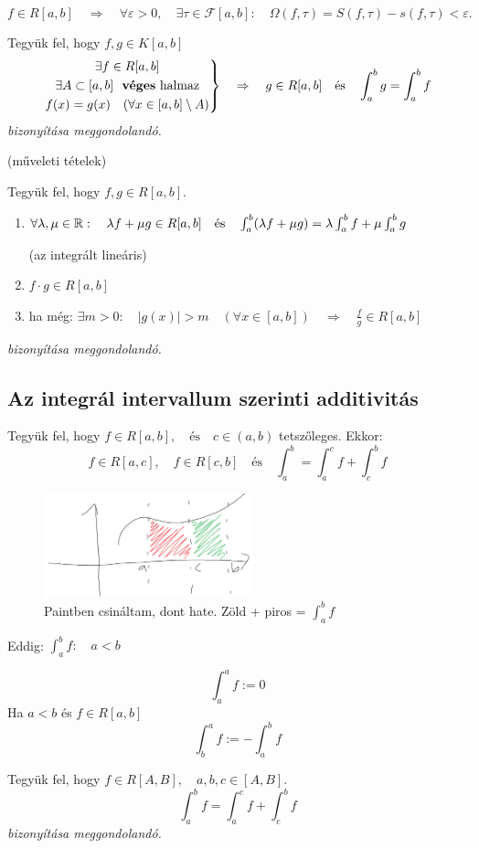 \documentclass[a4paper,11.5pt]{article}
\begin{document}
	\begin{revision}
		$$f\in R[a,b]\quad \Rightarrow\quad \forall\varepsilon>0,\quad \exists\tau\in\mathcal{F}[a,b]:\quad \varOmega(f,\tau)=S(f,\tau)-s(f,\tau)<\varepsilon. $$
	\end{revision}
	\begin{theorem}
		Tegyük fel, hogy $f,g\in K[a,b]$
		\[ \left.\begin{gathered}
			\exists f\in R[a,b]\\
			\exists A\subset[a,b] \ \text{ \textbf{véges} halmaz}\\
			f(x)=g(x)\quad (\forall x\in[a,b]\setminus A)
		\end{gathered}\right\}\quad \Rightarrow\quad g\in R[a,b]\quad \text{és}\quad \int_a^bg=\int_a^bf \]
		\textit{bizonyítása meggondolandó.}
	\end{theorem}
	\begin{theorem}
		(műveleti tételek)
		
		Tegyük fel, hogy $f,g\in R[a,b]$.
		\begin{enumerate}
			\item $\forall \lambda, \mu\in\mathbb{R}:\quad \lambda f+\mu g\in R[a,b]\quad \text{és}\quad \int_a^b(\lambda f + \mu g)=\lambda\int_a^b f+\mu\int_a^bg$ 
			
			(az integrált lineáris)
			\item $f\cdot g\in R[a,b]$
			\item ha még: $\exists m>0:\quad |g(x)|>m\quad (\forall x\in[a,b])\quad \Rightarrow\quad \frac{f}{g}\in R[a,b]$
		\end{enumerate}
		\textit{bizonyítása meggondolandó.}
	\end{theorem}
	\subsection{Az integrál intervallum szerinti additivitás}
	
	\begin{theorem}
		Tegyük fel, hogy $f\in R[a,b],\quad \text{és}\quad c\in(a,b)$ tetszőleges. Ekkor:
		\[ f\in R[a,c],\quad f\in R[c,b]\quad \text{és}\quad \int_a^b=\int_a^cf+\int_c^bf \]
	\end{theorem}
	
	\begin{figure}[!h]
		\centering
		\includegraphics[height=3cm]{kepek/first.png}
		\caption{Paintben csináltam, dont hate. Zöld + piros = $\int_a^bf$}\label{}
	\end{figure}
	Eddig: $\int_a^bf:\quad a<b$
	\begin{definition}
		\[ \int_a^af:=0 \]
		Ha $a<b$ és $f\in R[a,b]$
		\[ \int_b^af:=-\int_a^bf \]
	\end{definition}
	\begin{theorem}
		Tegyük fel, hogy $f\in R[A,B],\quad a,b,c\in[A,B]$.
		\[ \int_a^bf=\int_a^cf+\int_c^bf \]
		\textit{bizonyítása meggondolandó.}
	\end{theorem}
\end{document}
